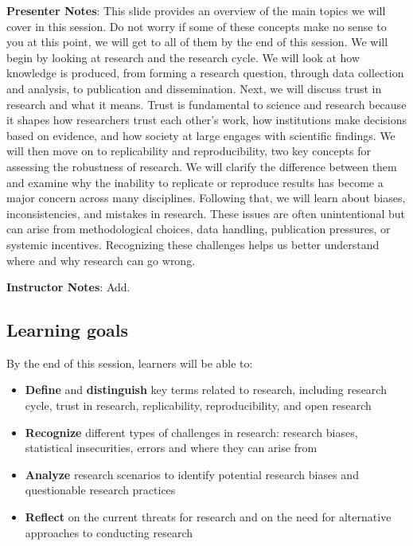 \documentclass[
  letterpaper,
  DIV=11,
  numbers=noendperiod]{scrartcl}
\providecommand{\tightlist}{%
  \setlength{\itemsep}{0pt}\setlength{\parskip}{0pt}}
\begin{document}
\textbf{Presenter Notes}: This slide provides an overview of the main
topics we will cover in this session. Do not worry if some of these
concepts make no sense to you at this point, we will get to all of them
by the end of this session. We will begin by looking at research and the
research cycle. We will look at how knowledge is produced, from forming
a research question, through data collection and analysis, to
publication and dissemination. Next, we will discuss trust in research
and what it means. Trust is fundamental to science and research because
it shapes how researchers trust each other's work, how institutions make
decisions based on evidence, and how society at large engages with
scientific findings. We will then move on to replicability and
reproducibility, two key concepts for assessing the robustness of
research. We will clarify the difference between them and examine why
the inability to replicate or reproduce results has become a major
concern across many disciplines. Following that, we will learn about
biases, inconsistencies, and mistakes in research. These issues are
often unintentional but can arise from methodological choices, data
handling, publication pressures, or systemic incentives. Recognizing
these challenges helps us better understand where and why research can
go wrong.

\textbf{Instructor Notes}: Add.

\subsection{Learning goals}\label{learning-goals}

By the end of this session, learners will be able to:

\begin{itemize}
\tightlist
\item
  \textbf{Define} and \textbf{distinguish} key terms related to
  research, including research cycle, trust in research, replicability,
  reproducibility, and open research
\item
  \textbf{Recognize} different types of challenges in research: research
  biases, statistical insecurities, errors and where they can arise from
\item
  \textbf{Analyze} research scenarios to identify potential research
  biases and questionable research practices
\item
  \textbf{Reflect} on the current threats for research and on the need
  for alternative approaches to conducting research
\end{itemize}
\end{document}
